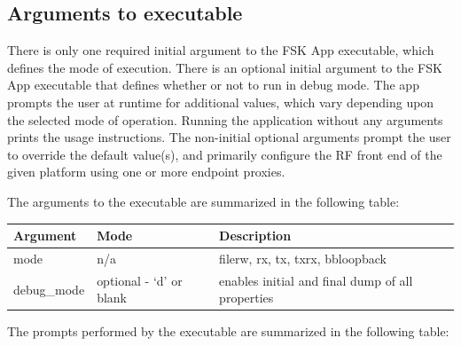 \subsection{Arguments to executable}
There is only one required initial argument to the FSK App executable, which defines the mode of execution. There is an optional initial argument to the FSK App executable that defines whether or not to run in debug mode. The app prompts the user at runtime for additional values, which vary depending upon the selected mode of operation. Running the application without any arguments prints the usage instructions. The non-initial optional arguments prompt the user to override the default value(s), and primarily configure the RF front end of the given platform using one or more endpoint proxies.\par\medskip
\noindent The arguments to the executable are summarized in the following table:\\
\begin{tabular}{|l|l|l|}
\hline
\rowcolor{blue}
Argument & Mode & Description \\
\hline
mode & n/a & filerw, rx, tx, txrx, bbloopback\\
\hline
debug\_mode & optional - `d' or blank & enables initial and final dump of all properties\\
\hline
\end{tabular}\par\bigskip
\noindent The prompts performed by the executable are summarized in the following table:\\
